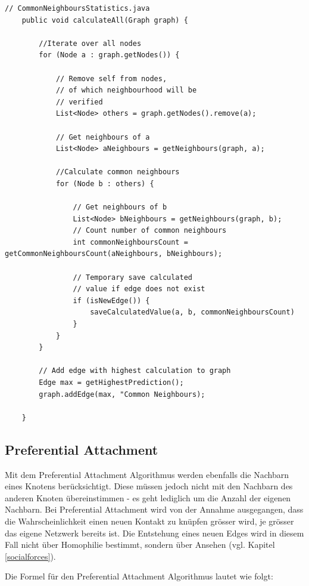 \begin{lstlisting}[caption={Common neighbour implementation},label=lstCommonNeighbour]
    // CommonNeighboursStatistics.java
    public void calculateAll(Graph graph) {

        //Iterate over all nodes
        for (Node a : graph.getNodes()) {

            // Remove self from nodes,
            // of which neighbourhood will be
            // verified
            List<Node> others = graph.getNodes().remove(a);

            // Get neighbours of a
            List<Node> aNeighbours = getNeighbours(graph, a);

            //Calculate common neighbours
            for (Node b : others) {

                // Get neighbours of b
                List<Node> bNeighbours = getNeighbours(graph, b);
                // Count number of common neighbours
                int commonNeighboursCount = getCommonNeighboursCount(aNeighbours, bNeighbours);

                // Temporary save calculated
                // value if edge does not exist
                if (isNewEdge()) {
                    saveCalculatedValue(a, b, commonNeighboursCount)
                }
            }
        }

        // Add edge with highest calculation to graph
        Edge max = getHighestPrediction();
        graph.addEdge(max, "Common Neighbours);

    }
\end{lstlisting}

\subsection{Preferential Attachment}
Mit dem Preferential Attachment Algorithmus werden ebenfalls die Nachbarn eines Knotens berücksichtigt. Diese müssen jedoch nicht
mit den Nachbarn des anderen Knoten übereinstimmen - es geht lediglich um die Anzahl der eigenen Nachbarn. Bei Preferential Attachment
wird von der Annahme ausgegangen, dass die Wahrscheinlichkeit einen neuen Kontakt zu knüpfen grösser wird, je grösser das eigene Netzwerk bereits ist.
Die Entstehung eines neuen Edges wird in diesem Fall nicht über Homophilie bestimmt, sondern über Ansehen (vgl. Kapitel \ref{socialforces}).

Die Formel für den Preferential Attachment Algorithmus lautet wie folgt:

